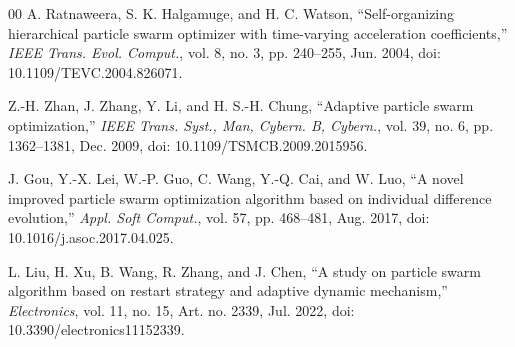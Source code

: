 \documentclass[conference]{IEEEtran}
\begin{document}
\begin{thebibliography}{00}
     A. Ratnaweera, S. K. Halgamuge, and H. C. Watson, ``Self-organizing hierarchical particle swarm optimizer with time-varying acceleration coefficients,'' \textit{IEEE Trans. Evol. Comput.}, vol. 8, no. 3, pp. 240--255, Jun. 2004, doi: 10.1109/TEVC.2004.826071.

     Z.-H. Zhan, J. Zhang, Y. Li, and H. S.-H. Chung, ``Adaptive particle swarm optimization,'' \textit{IEEE Trans. Syst., Man, Cybern. B, Cybern.}, vol. 39, no. 6, pp. 1362--1381, Dec. 2009, doi: 10.1109/TSMCB.2009.2015956.

     J. Gou, Y.-X. Lei, W.-P. Guo, C. Wang, Y.-Q. Cai, and W. Luo, ``A novel improved particle swarm optimization algorithm based on individual difference evolution,'' \textit{Appl. Soft Comput.}, vol. 57, pp. 468--481, Aug. 2017, doi: 10.1016/j.asoc.2017.04.025.

     L. Liu, H. Xu, B. Wang, R. Zhang, and J. Chen, ``A study on particle swarm algorithm based on restart strategy and adaptive dynamic mechanism,'' \textit{Electronics}, vol. 11, no. 15, Art. no. 2339, Jul. 2022, doi: 10.3390/electronics11152339.
\end{thebibliography}
\end{document}
